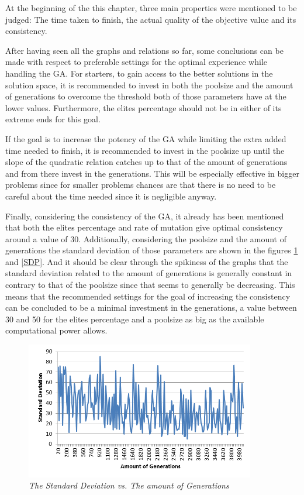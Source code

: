 \par
At the beginning of the this chapter, three main properties were mentioned to be judged: The time taken to finish, the actual quality of the objective value and its consistency.
\par
After having seen all the graphs and relations so far, some conclusions can be made with respect to preferable settings for the optimal experience while handling the GA.
For starters, to gain access to the better solutions in the solution space, it is recommended to invest in both the poolsize and the amount of generations to overcome the threshold both of those parameters have at the lower values. Furthermore, the elites percentage should not be in either of its extreme ends for this goal.
\par
If the goal is to increase the potency of the GA while limiting the extra added time needed to finish, it is recommended to invest in the poolsize up until the slope of the quadratic relation catches up to that of the amount of generations and from there invest in the generations. This will be especially effective in bigger problems since for smaller problems chances are that there is no need to be careful about the time needed since it is negligible anyway.
\par
Finally, considering the consistency of the GA, it already has been mentioned that both the elites percentage and rate of mutation give optimal consistency around a value of 30. Additionally, considering the poolsize and the amount of generations the standard deviation of those parameters are shown in the figures \ref{SDG} and \ref{SDP}. And it should be clear through the spikiness of the graphs that the standard deviation related to the amount of generations is generally constant in contrary to that of the poolsize since that seems to generally be decreasing. This means that the recommended settings for the goal of increasing the consistency can be concluded to be a minimal investment in the generations, a value between 30 and 50 for the elites percentage and a poolsize as big as the available computational power allows.

\begin{figure}[h] 
	\centering
	\includegraphics[height=6cm]{SDG}
	\caption{\textsl{The Standard Deviation vs. The amount of Generations}}
	\label{SDG}
\end{figure}

